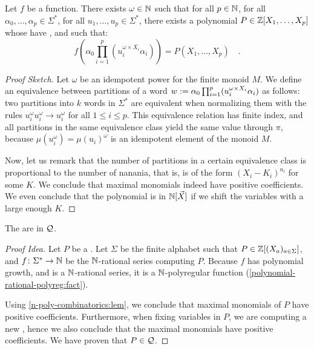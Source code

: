 \documentclass[a4paper,11pt]{article}
\begin{document}
\begin{lemma}
    \label{n-poly-combinatorics:lem}
    Let $f$ be a   function. 
    There exists $\omega \in \mathbb{N}$
    such that for all $p \in \mathbb{N}$,
    for all $\alpha_0, \dots, \alpha_p \in \Sigma^*$,
    for all $u_1, \dots, u_p \in \Sigma^*$,
    there exists a polynomial $P \in \mathbb{Z}[X_1, \dots, X_p]$
    whose  have ,
    and such that:
    \begin{equation*}
        f(\alpha_0 \prod_{i = 1}^p (u_i^{\omega \times X_i} \alpha_i))
        = P(X_1, \dots, X_p) \quad .
    \end{equation*}
\end{lemma}
\begin{proof}[Proof Sketch]
    Let $\omega$ be an idempotent power for the finite monoid $M$.
    We define an equivalence between partitions of a word 
    $w \mathrel{:=} \alpha_0 \prod_{i = 1}^p (u_i^{\omega \times X_i} \alpha_i)$
    as follows: two partitions into $k$ words in $\Sigma^*$ are equivalent
    when normalizing them with the rules
    $u_i^{\omega} u_i^{\omega} \to u_i^{\omega}$ for all $1 \leq i \leq p$.
    This equivalence relation has finite index, and all partitions in the same
    equivalence class yield the same value through $\pi$, because
    $\mu(u_i^\omega) = \mu(u_i)^\omega$ is an idempotent element of the monoid $M$.

    Now, let us remark that the number of partitions
    in a certain equivalence class is proportional to
    the number of nanania, that is, is of the form
    $(X_i - K_i)^{n_i}$ for some $K$. We conclude that
    maximal monomials indeed have positive coefficients.
    We even conclude that
    the polynomial is in $\mathbb{N}[\vec{X}]$
    if we shift the variables with a large enough $K$. 
\end{proof}


\begin{lemma}
    The  are in $\mathcal{Q}$.
\end{lemma}
\begin{proof}[Proof Idea]
    Let $P$ be a .
    Let $\Sigma$  be the finite alphabet such that
    $P \in \mathbb{Z}[(X_a)_{a \in \Sigma}]$,
    and $f \colon \Sigma^* \to \mathbb{N}$ be the 
    $\mathbb{N}$-rational series computing $P$.
    Because $f$ has polynomial growth, and is a $\mathbb{N}$-rational series,
    it is a $\mathbb{N}$-polyregular function 
    (\cref{polynomial-rational-polyreg:fact}).

    Using \cref{n-poly-combinatorics:lem},
    we conclude that maximal monomials of $P$ have
    positive coefficients. Furthermore, when fixing variables
    in $P$, we are computing a new ,
    hence we also conclude that the maximal monomials have
    positive coefficients.
    We have proven that $P \in \mathcal{Q}$.
\end{proof}
\end{document}

